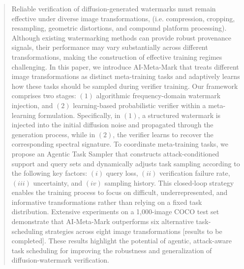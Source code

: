 \begin{abstract} %
{\color{blue}
Reliable verification of diffusion-generated watermarks must remain effective under diverse image transformations, (i.e. compression, cropping, resampling, geometric distortions, and compound platform processing). Although existing watermarking methods can provide robust provenance signals, their performance may vary substantially across different transformations, making the construction of effective training regimes challenging.
In this paper, we introduce AI-Meta-Mark that treats different image transformations as distinct meta-training tasks and adaptively learns how these tasks should be sampled during verifier training. Our framework comprises two stages: $(1)$ algorithmic frequency-domain watermark injection, and $(2)$ learning-based probabilistic verifier within a meta-learning formulation. Specifically, in $(1)$,  a structured watermark is injected into the initial diffusion noise and propagated through the generation process, while in $(2)$, the verifier learns to recover the corresponding spectral signature. To coordinate meta-training tasks, we propose an Agentic Task Sampler that constructs attack-conditioned support and query sets and dynamically adjusts task sampling according to the following key factors: $(i)$ query loss, $(ii)$ verification failure rate, $(iii)$ uncertainty, and $(iv)$ sampling history. This closed-loop strategy enables the training process to focus on difficult, underrepresented, and informative transformations rather than relying on a fixed task distribution.
Extensive experiments on a 1,000-image COCO test set demonstrate that AI-Meta-Mark outperforms six alternative task-scheduling strategies across eight image transformations [results to be completed]. These results highlight the potential of agentic, attack-aware task scheduling for improving the robustness and generalization of diffusion-watermark verification.}






\end{abstract}
